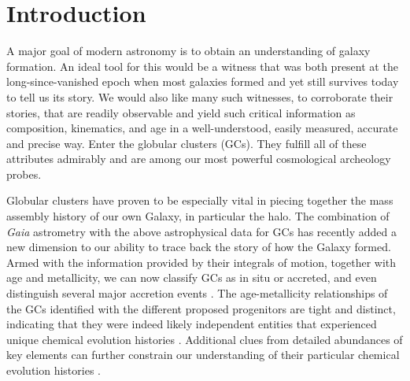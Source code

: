 \documentclass[onecolumn]{aa}
\begin{document}

   \maketitle
   
%

\section{Introduction}

A major goal of modern astronomy is to obtain an understanding of galaxy formation. An ideal tool for this would be a witness  that was both present at the long-since-vanished epoch when most galaxies formed and yet still survives today to tell us its story. We would also like many such witnesses, to corroborate their stories, that are readily observable and yield such critical information as composition, kinematics, and age in a  well-understood, easily measured, accurate and precise way. Enter the globular clusters (GCs). They fulfill all of these attributes admirably and are among our most powerful cosmological archeology probes. 

Globular clusters have proven to be especially vital in piecing together the mass assembly history of our own Galaxy, in particular the halo. The combination of {\em Gaia} astrometry with the above astrophysical data for GCs has recently added a new dimension to our ability to trace back the story of how the Galaxy formed. Armed  with the information provided by their integrals of motion, together with age and metallicity, we can now classify GCs as in situ or accreted, and even distinguish several major accretion events \citep[e.g.,][]{Massari2019, Bajkova2020, Kruijssen2020}. The age-metallicity relationships of the GCs identified with the different proposed progenitors are tight and distinct, indicating that they were indeed likely independent entities that experienced  unique chemical evolution histories \citep{Kruijssen2019, Massari2019, Myeong2019}. Additional clues from detailed abundances of key elements can further constrain our understanding of their particular chemical evolution histories \citep{Horta2020}.
\end{document}
